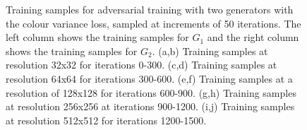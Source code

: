 \begin{figure}[!htbp]
    \hfill
    \hfill
    \hfill
    \hfill
    \hfill
    \caption[Training samples for adversarial training with two generators with the colour variance loss]{Training samples for adversarial training with two generators with the colour variance loss, sampled at increments of 50 iterations. The left column shows the training samples for $G_{1}$ and the right column shows the training samples for $G_{2}$. (a,b) Training samples at resolution 32x32 for iterations 0-300. (c,d) Training samples at resolution 64x64 for iterations 300-600. (e,f) Training samples at a resolution of 128x128 for iterations 600-900. (g,h) Training samples at resolution 256x256 at iterations 900-1200. (i,j) Training samples at resolution 512x512 for iterations 1200-1500.}
    \label{fig:c3:samples-col-var}
  \end{figure}

